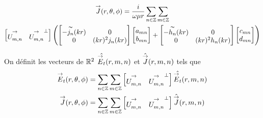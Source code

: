         \begin{multline}
            {\overset{\rightarrow}{J}}(r,\theta,\phi) = \dfrac{i}{\omega\mu r}\sum_{n\in\mathbb Z}\sum_{m\in\mathbb Z}\\
            \begin{bmatrix}
                {\overset{\rightarrow}{U_{m,n}^{{}}}} & {\overset{\rightarrow}{U_{m,n}^{{}}}}^\perp
            \end{bmatrix}
            \left(
                \begin{bmatrix}
                    -\overset{\thicksim}{j_n}(kr) & 0
                    \\
                    0 & (kr)^2 j_n(kr)
                \end{bmatrix}
                \begin{bmatrix}
                    a_{mn}
                    \\
                    b_{mn}
                \end{bmatrix}
                +
                \begin{bmatrix}
                    -\overset{\thicksim}{h_n}(kr) & 0
                    \\                
                    0 & (kr)^2 h_n(kr)
                \end{bmatrix}
                \begin{bmatrix}
                    c_{mn}
                    \\
                    d_{mn}
                \end{bmatrix}
            \right)
        \end{multline}

        \begin{defn}
            On définit les vecteurs de \(\mathbb R^2\) \(\hat{{\overset{\rightarrow}{E}}_t}(r,m,n)\) et \(\hat{{\overset{\rightarrow}{J}}}(r,m,n)\) tels que
            \begin{align}
                {\overset{\rightarrow}{E}}_t(r,\theta,\phi) &= \sum_{n\in\mathbb Z}\sum_{m\in\mathbb Z}
                \begin{bmatrix}
                  {\overset{\rightarrow}{U_{m,n}^{{}}}} & {\overset{\rightarrow}{U_{m,n}^{{}}}}^\perp
                \end{bmatrix}\hat{{\overset{\rightarrow}{E}}_t}(r,m,n)
                \\
                {\overset{\rightarrow}{J}}(r,\theta,\phi) &= \sum_{n\in\mathbb Z}\sum_{m\in\mathbb Z}
                \begin{bmatrix}
                  {\overset{\rightarrow}{U_{m,n}^{{}}}} & {\overset{\rightarrow}{U_{m,n}^{{}}}}^\perp
                \end{bmatrix}\hat{{\overset{\rightarrow}{J}}}(r,m,n)
            \end{align}
        \end{defn}

